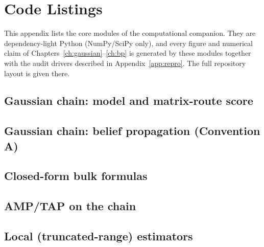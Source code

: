 \chapter{Code Listings}\label{app:code}

This appendix lists the core modules of the computational companion. They
are dependency-light Python (NumPy/SciPy only), and every figure and
numerical claim of Chapters~\ref{ch:gaussian}--\ref{ch:bp} is generated by
these modules together with the audit drivers described in
Appendix~\ref{app:repro}. The full repository layout is given there.

\section{Gaussian chain: model and matrix-route score}
\label{app:code-ar1}



\section{Gaussian chain: belief propagation (Convention A)}
\label{app:code-bp}



\section{Closed-form bulk formulas}\label{app:code-chain}



\section{AMP/TAP on the chain}\label{app:code-amp}



\section{Local (truncated-range) estimators}\label{app:code-local}

